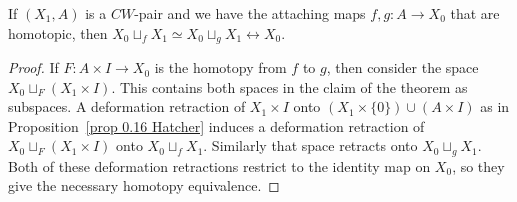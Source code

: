 \begin{prop}
    If $(X_1,A)$ is a $CW$-pair and we have the attaching maps $f,g:A\to X_0$ that are homotopic, then $X_0\sqcup_f X_1\simeq X_0\sqcup_g X_1 \rel X_0$.
\end{prop}
\begin{proof}
    If $F:A\times I\to X_0$ is the homotopy from $f$ to $g$, then consider the space $X_0\sqcup_F (X_1\times I)$. This contains both spaces in the claim of the theorem as subspaces. A deformation retraction of $X_1\times I$ onto $(X_1\times \{0\})\cup (A\times I)$ as in Proposition~\ref{prop 0.16 Hatcher} induces a deformation retraction of $X_0\sqcup_F (X_1\times I)$ onto $X_0\sqcup_f X_1$. Similarly that space retracts onto $X_0\sqcup_g X_1$. Both of these deformation retractions restrict to the identity map on $X_0$, so they give the necessary homotopy equivalence.
\end{proof}

